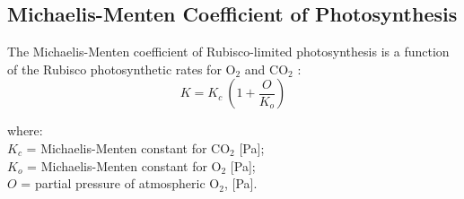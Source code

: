 \documentclass{myreport}
\begin{document}
\subsection{Michaelis-Menten Coefficient of Photosynthesis}
\label{sec:kmm}
The Michaelis-Menten coefficient of Rubisco-limited photosynthesis is a function of the Rubisco photosynthetic rates for O$_2$ and CO$_2$ \cite{farquhar80}:
\begin{equation}
\label{eq:michaelis}
	K = K_c\: \left( 1 + \frac{O}{K_o} \right)
\end{equation}

\noindent where:\\
\indent $K_c$ = Michaelis-Menten constant for CO$_2$ [Pa];\\
\indent $K_o$ = Michaelis-Menten constant for O$_2$ [Pa];\\
\indent $O$ = partial pressure of atmospheric O$_2$, [Pa].\\
\end{document}
